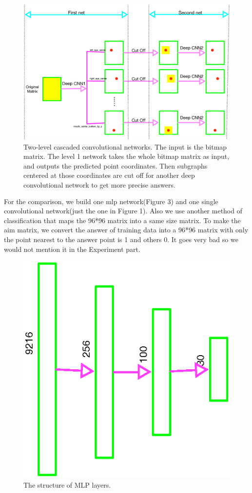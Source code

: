 \documentclass[10pt,twocolumn,letterpaper]{article}
\begin{document}
\begin{figure}[htbp]
\centering
\includegraphics[width=0.8\linewidth]{figure2.eps}
   \caption{Two-level cascaded convolutional networks. The input is the bitmap matrix. The level 1 network takes the whole bitmap matrix as input, and outputs the predicted point coordinates. Then subgraphs centered at those coordinates are cut off for another deep convolutional network to get more precise answers.}
\label{fig:cascade}
\end{figure}

For the comparison, we build one mlp network(Figure 3) and one single convolutional network(just the one in Figure 1). Also we use another method of classification that maps the 96*96 matrix into a same size matrix. To make the aim matrix, we  convert the answer of training data into a 96*96 matrix with only the point nearest to the answer point is 1 and others 0. It goes very bad so we would not mention it in the Experiment part.

\begin{figure}[htbp]
\centering
\includegraphics[width=0.8\linewidth]{MLP.eps}
   \caption{The structure of MLP layers.}
\label{fig:long}
\label{fig:onecol}
\end{figure}
\end{document}

